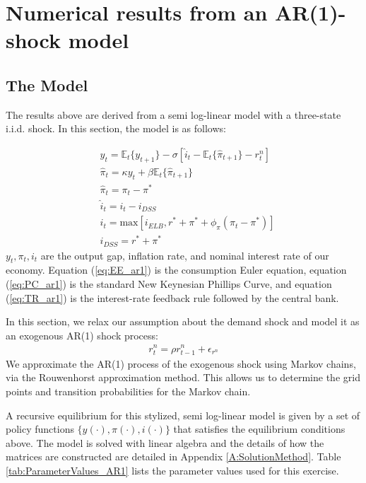 \documentclass[11pt]{article}
\begin{document}
	\section{Numerical results from an AR(1)-shock model}
	\label{S:NumericalResults}
	
	\subsection{The Model}
	
	The results above are derived from a semi log-linear model with a three-state i.i.d. shock. In this section, the model is as follows:
	
	\begin{align}
	& y_{t} = \mathbb{E}_t\{y_{t+1}\} - \sigma\left[\hat{i}_t - \mathbb{E}_t\{\hat{\pi}_{t+1}\}-r_t^n\right] \label{eq:EE_ar1}\\
	& \hat{\pi}_{t} = \kappa y_t + \beta\mathbb{E}_t\{\hat{\pi}_{t+1}\}\label{eq:PC_ar1}\\
	& \hat{\pi}_t = \pi_t - \pi^*\\
	& \hat{i}_t = i_t - i_{DSS} \\
	& i_t = \text{max}\left[i_{ELB},r^* + \pi^* + \phi_{\pi}(\pi_t - \pi^*)\right]\label{eq:TR_ar1}\\
	& i_{DSS} = r^* + \pi^*
	\end{align}
	$y_t, \pi_t, i_t$ are the output gap, inflation rate, and nominal interest rate of our economy. Equation (\ref{eq:EE_ar1}) is the consumption Euler equation, equation (\ref{eq:PC_ar1}) is the standard New Keynesian Phillips Curve, and equation (\ref{eq:TR_ar1}) is the interest-rate feedback rule followed by the central bank. 
	
	 In this section, we relax our assumption about the demand shock and model it as an exogenous AR(1) shock process: 
	\begin{align}
	r^n_t = \rho r^n_{t-1} + \epsilon_{r^n}
	\end{align}
	We approximate the AR(1) process of the exogenous shock using Markov chains, via the Rouwenhorst approximation method. This allows us to determine the grid points and transition probabilities for the Markov chain. 
	
	A recursive equilibrium for this stylized, semi log-linear model is given by a set of policy functions $\{y(\cdot), \pi(\cdot), i(\cdot)\}$ that satisfies the equilibrium conditions above. The model is solved with linear algebra and the details of how the matrices are constructed are detailed in Appendix \ref{A:SolutionMethod}. Table \ref{tab:ParameterValues_AR1} lists the parameter values used for this exercise. 
	
\end{document}
